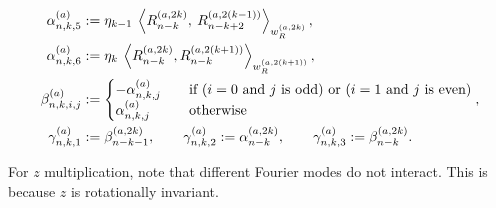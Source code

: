 \documentclass[11pt, oneside]{article}   	%
\begin{document}
\begin{lemma}
\begin{align*}
	\alphaa_{n,k,5} &:= \eta_{k-1} \: \ip<\genjacnmk^{(a, 2k)}, \: \genjac_{n-k+2}^{(a, 2(k-1))}>_{\genjacw^{(a, 2k)}}, \\
	\alphaa_{n,k,6} &:=\eta_{k} \: \ip<\genjacnmk^{(a, 2k)}, \genjacnmk^{(a, 2(k+1))}>_{\genjacw^{(a, 2(k+1))}}, \\
	\betaa_{n,k,i,j} &:= 
		\begin{cases}
			- \alphaa_{n,k,j} \quad &\text{if }(i = 0 \text{ and } j \text{ is odd}) \text{ or }(i = 1 \text{ and } j \text{ is even}) \\
			\alphaa_{n,k,j} \quad &\text{otherwise}
		\end{cases}, \\	
	\gammaa_{n,k,1} &:= \beta_{n-k-1}^{(a, 2k)}, \qquad \gammaa_{n,k,2} := \alpha_{n-k}^{(a, 2k)}, \qquad \gammaa_{n,k,3} := \beta_{n-k}^{(a, 2k)}.
\end{align*}
\end{lemma}
\begin{remark}
For $z$ multiplication, note that different Fourier modes do not interact. This is because $z$ is rotationally invariant. 
\end{remark}
\end{document}
